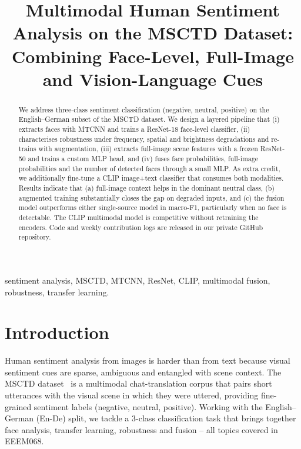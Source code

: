 \documentclass[conference]{IEEEtran}
\title{Multimodal Human Sentiment Analysis on the MSCTD Dataset:\\
Combining Face-Level, Full-Image and Vision-Language Cues}
\author{
\IEEEauthorblockN{Shaik Sameer\IEEEauthorrefmark{1},
                  Ammineni Harshitha\IEEEauthorrefmark{1},
                  Tharigopula Sai Teja\IEEEauthorrefmark{1},
                  Kakumanu Ravi Teja\IEEEauthorrefmark{1},
                  Mosi Curran\IEEEauthorrefmark{1}}
\IEEEauthorblockA{\IEEEauthorrefmark{1}EEEM068 Applied Machine Learning, University of Surrey, UK}
}
\begin{document}
\maketitle

\begin{abstract}
We address three-class sentiment classification (negative, neutral, positive)
on the English--German subset of the MSCTD dataset. We design a layered
pipeline that (i) extracts faces with MTCNN and trains a ResNet-18
face-level classifier, (ii) characterises robustness under frequency,
spatial and brightness degradations and re-trains with augmentation,
(iii) extracts full-image scene features with a frozen ResNet-50 and
trains a custom MLP head, and (iv) fuses face probabilities, full-image
probabilities and the number of detected faces through a small MLP. As
extra credit, we additionally fine-tune a CLIP image+text classifier
that consumes both modalities. Results indicate that (a) full-image
context helps in the dominant neutral class, (b) augmented training
substantially closes the gap on degraded inputs, and (c) the fusion
model outperforms either single-source model in macro-F1, particularly
when no face is detectable. The CLIP multimodal model is competitive
without retraining the encoders. Code and weekly contribution logs are
released in our private GitHub repository.
\end{abstract}

\begin{IEEEkeywords}
sentiment analysis, MSCTD, MTCNN, ResNet, CLIP, multimodal fusion,
robustness, transfer learning.
\end{IEEEkeywords}

\section{Introduction}\label{sec:intro}
Human sentiment analysis from images is harder than from text because
visual sentiment cues are sparse, ambiguous and entangled with scene
context. The MSCTD dataset~\cite{msctd} is a multimodal chat-translation
corpus that pairs short utterances with the visual scene in which they
were uttered, providing fine-grained sentiment labels (negative, neutral,
positive). Working with the English--German (En-De) split, we tackle a
3-class classification task that brings together face analysis, transfer
learning, robustness and fusion -- all topics covered in EEEM068.
\end{document}
